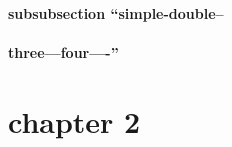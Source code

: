 \documentclass{book}
\begin{document}
\label{anchor:anchor}%

\subsubsection{subsubsection ``simple-double--}
\label{anchor:subsubsection-_0060_0060simple_002ddouble_002d_002d}%

\subsubsection{three---four----''}
\label{anchor:subsubsection-three_002d_002d_002dfour_002d_002d_002d_002d_0027_0027}%

\chapter*{\centering chapter 2}
\label{anchor:chapter2}%

\printindex[cp]
\printindex[fn]

\tableofcontents\newpage
\end{document}
